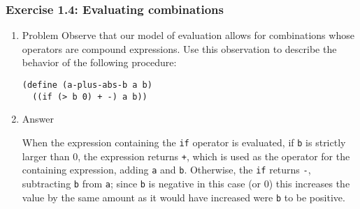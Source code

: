 \documentclass[11pt]{article}
\begin{document}
\subsubsection{Exercise 1.4: Evaluating combinations}
\label{sec-1-1-4}
\begin{enumerate}
\item Problem
\label{sec-1-1-4-1}
Observe that our model of evaluation allows for combinations
whose operators are compound expressions.  Use this observation
to describe the behavior of the following procedure:

\begin{verbatim}
(define (a-plus-abs-b a b)
  ((if (> b 0) + -) a b))
\end{verbatim}
\item Answer
\label{sec-1-1-4-2}

When the expression containing the \texttt{if} operator is evaluated, if \texttt{b}
is strictly larger than 0, the expression returns \texttt{+}, which is used
as the operator for the containing expression, adding \texttt{a} and
\texttt{b}. Otherwise, the \texttt{if} returns \texttt{-}, subtracting \texttt{b} from \texttt{a}; since
\texttt{b} is negative in this case (or 0) this increases the value by the
same amount as it would have increased were \texttt{b} to be positive.
\end{enumerate}
\end{document}

